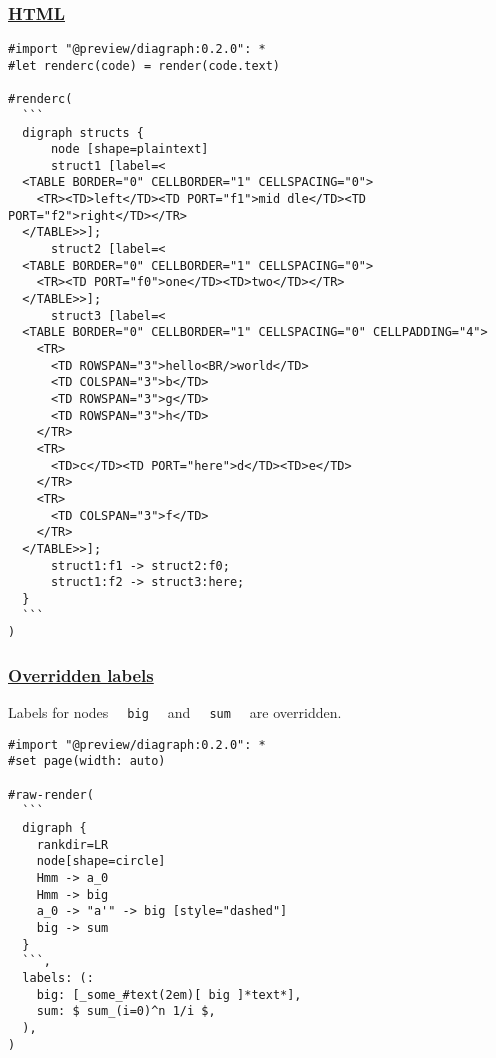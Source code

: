 \pandocbounded{}

\subsubsection{\texorpdfstring{\hyperref[html]{HTML}}{HTML}}\label{html}

\begin{verbatim}
#import "@preview/diagraph:0.2.0": *
#let renderc(code) = render(code.text)

#renderc(
  ```
  digraph structs {
      node [shape=plaintext]
      struct1 [label=<
  <TABLE BORDER="0" CELLBORDER="1" CELLSPACING="0">
    <TR><TD>left</TD><TD PORT="f1">mid dle</TD><TD PORT="f2">right</TD></TR>
  </TABLE>>];
      struct2 [label=<
  <TABLE BORDER="0" CELLBORDER="1" CELLSPACING="0">
    <TR><TD PORT="f0">one</TD><TD>two</TD></TR>
  </TABLE>>];
      struct3 [label=<
  <TABLE BORDER="0" CELLBORDER="1" CELLSPACING="0" CELLPADDING="4">
    <TR>
      <TD ROWSPAN="3">hello<BR/>world</TD>
      <TD COLSPAN="3">b</TD>
      <TD ROWSPAN="3">g</TD>
      <TD ROWSPAN="3">h</TD>
    </TR>
    <TR>
      <TD>c</TD><TD PORT="here">d</TD><TD>e</TD>
    </TR>
    <TR>
      <TD COLSPAN="3">f</TD>
    </TR>
  </TABLE>>];
      struct1:f1 -> struct2:f0;
      struct1:f2 -> struct3:here;
  }
  ```
)
\end{verbatim}

\pandocbounded{}

\subsubsection{\texorpdfstring{\hyperref[overridden-labels]{Overridden
labels}}{Overridden labels}}\label{overridden-labels}

Labels for nodes \texttt{\ }{\texttt{\ big\ }}\texttt{\ } and
\texttt{\ }{\texttt{\ sum\ }}\texttt{\ } are overridden.

\begin{verbatim}
#import "@preview/diagraph:0.2.0": *
#set page(width: auto)

#raw-render(
  ```
  digraph {
    rankdir=LR
    node[shape=circle]
    Hmm -> a_0
    Hmm -> big
    a_0 -> "a'" -> big [style="dashed"]
    big -> sum
  }
  ```,
  labels: (:
    big: [_some_#text(2em)[ big ]*text*],
    sum: $ sum_(i=0)^n 1/i $,
  ),
)
\end{verbatim}

